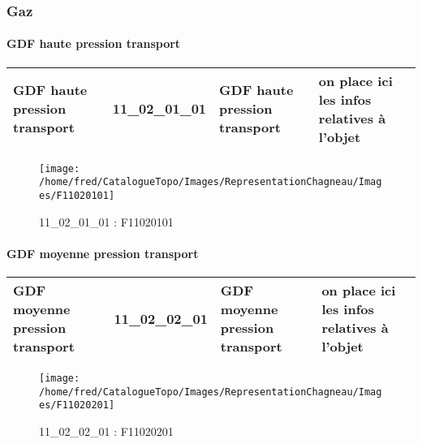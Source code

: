 \documentclass[12pt,titlepage,oneside]{book}
\begin{document}
\subsubsection{\large Gaz}
\paragraph{GDF haute pression transport}
\noindent
\vspace{\baselineskip}

\renewcommand{\arraystretch}{1.2}
\begin{supertabular}{|p{10cm}|c|p{13cm}|p{12cm}|}
 GDF haute pression transport & 11\_02\_01\_01 & GDF haute pression transport & on place ici les infos relatives à l'objet\\
\hline
\end{supertabular}
\begin{figure}[h!]
  \hfill         %
  \begin{minipage}[t]{3cm}
    \begin{center}
      \texttt{[image: /home/fred/CatalogueTopo/Images/RepresentationChagneau/Images/F11020101]}
      \caption[F11020101]{\label{} 11\_02\_01\_01 : F11020101}
    \end{center}
  \end{minipage}
\end{figure}


\paragraph{GDF moyenne pression transport}
\noindent
\vspace{\baselineskip}

\renewcommand{\arraystretch}{1.2}
\begin{supertabular}{|p{10cm}|c|p{13cm}|p{12cm}|}
 GDF moyenne pression transport & 11\_02\_02\_01 & GDF moyenne pression transport & on place ici les infos relatives à l'objet\\
\hline
\end{supertabular}
\begin{figure}[h!]
  \hfill         %
  \begin{minipage}[t]{3cm}
    \begin{center}
      \texttt{[image: /home/fred/CatalogueTopo/Images/RepresentationChagneau/Images/F11020201]}
      \caption[F11020201]{\label{} 11\_02\_02\_01 : F11020201}
    \end{center}
  \end{minipage}
\end{figure}
\end{document}
